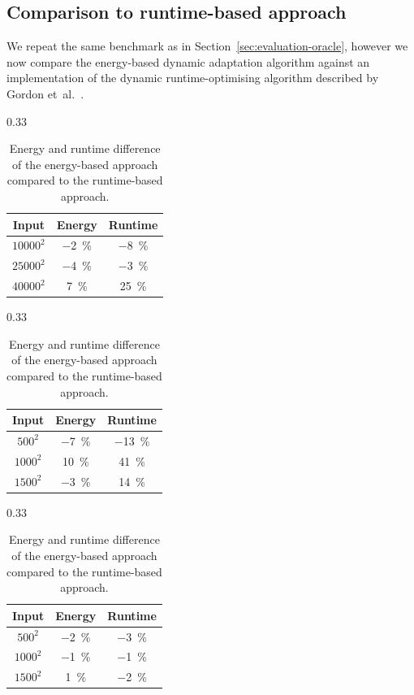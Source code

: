 \documentclass[runningheads]{llncs}
\begin{document}
\subsection{Comparison to runtime-based approach}\label{sec:evaluation-runtime}
We repeat the same benchmark as in Section~\ref{sec:evaluation-oracle}, however we now compare the energy-based dynamic adaptation algorithm against an implementation of the dynamic runtime-optimising algorithm described by Gordon et~al.~\cite{gordon2015dynamic}.

\begin{table}[ht]
  \centering
  \begin{subtable}{0.33\linewidth}
    \centering
    \begin{tabular}{ccc}\toprule
      Input & Energy & Runtime \\\midrule
      $10000^2$ & \qty{-2}{\percent} & \qty{-8}{\percent} \\
      $25000^2$ & \qty{-4}{\percent} & \qty{-3}{\percent} \\
      $40000^2$ & \qty{7}{\percent}  & \qty{25}{\percent} \\
    \bottomrule\end{tabular}%
    \caption{Nine-point stencil.}%
    \label{tab:rt-stencil}
  \end{subtable}%
  \begin{subtable}{0.33\linewidth}
    \centering
    \begin{tabular}{ccc}\toprule
      Input & Energy & Runtime \\\midrule
      $ 500^2$ & \qty{-7}{\percent} & \qty{-13}{\percent} \\
      $1000^2$ & \qty{10}{\percent} & \qty{41}{\percent} \\
      $1500^2$ & \qty{-3}{\percent} & \qty{14}{\percent} \\
    \bottomrule\end{tabular}%
    \caption{Matrix multiplication.}%
    \label{tab:rt-matmul}
  \end{subtable}%
  \begin{subtable}{0.33\linewidth}
    \centering
    \begin{tabular}{ccc}\toprule
      Input & Energy & Runtime \\\midrule
      $ 500^2$ & \qty{-2}{\percent} & \qty{-3}{\percent} \\
      $1000^2$ & \qty{-1}{\percent} & \qty{-1}{\percent} \\
      $1500^2$ & \qty{1}{\percent}  & \qty{-2}{\percent} \\
    \bottomrule\end{tabular}%
    \caption{Rust implementation.}%
    \label{tab:rt-rust}
  \end{subtable}%
  \caption{Energy and runtime difference of the energy-based approach compared to the runtime-based approach.}%
  \label{fig:rt}
\end{table}
\end{document}
